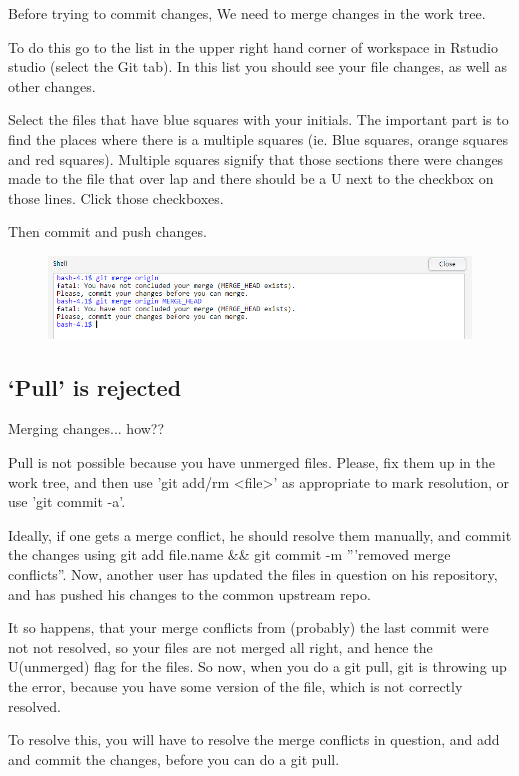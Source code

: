 \documentclass[12pt]{../SOP3_beta}
\begin{document}
\NP Before trying to commit changes, We need to merge changes in the work tree. 

\NP To do this go to the list in the upper right hand corner of workspace in Rstudio studio (select the Git tab). In this list you should see your file changes, as well as other changes. 

\NP Select the files that have blue squares with your initials. The important part is to find the places where there is a multiple squares (ie. Blue squares, orange squares and red squares). Multiple squares signify that those sections there were changes made to the file that over lap and there should be a U next to the checkbox on those lines. Click those checkboxes. 

\NP Then commit and push changes. 

\begin{figure}
\includegraphics{graphics/MergeError.jpg}
\end{figure}

\subsection{`Pull' is rejected}

\NP Merging changes... how??

Pull is not possible because you have unmerged files.
Please, fix them up in the work tree, and then use 'git add/rm <file>'
as appropriate to mark resolution, or use 'git commit -a'.

Ideally, if one gets a merge conflict, he should resolve them manually, and commit the changes using git add file.name \&\& git commit -m '''removed merge conflicts''. Now, another user has updated the files in question on his repository, and has pushed his changes to the common upstream repo.

It so happens, that your merge conflicts from (probably) the last commit were not not resolved, so your files are not merged all right, and hence the U(unmerged) flag for the files. So now, when you do a git pull, git is throwing up the error, because you have some version of the file, which is not correctly resolved.

To resolve this, you will have to resolve the merge conflicts in question, and add and commit the changes, before you can do a git pull.
\end{document}
